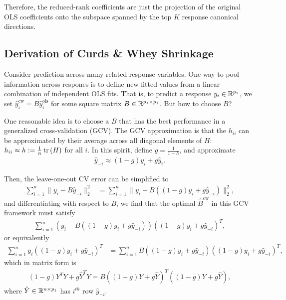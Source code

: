 \documentclass{article}
\begin{document}
Therefore, the reduced-rank coefficients are just the projection of the original
OLS coefficients onto the subspace spanned by the top $K$ response canonical
directions.

\subsection{Derivation of Curds \& Whey Shrinkage}
\label{subsec:derivation_curds_and_whey}

Consider prediction across many related response variables. One way to pool
information across respones is to define new fitted values from a linear
combination of independent OLS fits. That is, to predict a response $y_{i} \in
\mathbb{R}^{p_{1}}$, we set $\hat{y}^{\text{cw}}_{i} = B\hat{y}^{\text{ols}}_{i}$
for some square matrix $B \in \mathbb{R}^{p_{1} \times p_{1}}$. But how to choose
$B$?

One reasonable idea is to choose a $B$ that has the best performance in a
generalized cross-validation (GCV). The GCV approximation is that the $h_{ii}$
can be approximated by their average across all diagonal elements of $H$:
$h_{ii} \approx h := \frac{1}{n}\mathop\mathrm{tr}\left(H\right)$ for all $i$. In this spirit,
define $g = \frac{1}{1 - h}$, and approximate
\begin{align*}
  \hat{y}_{-i} \approx \left(1 - g\right)y_{i} + g\hat{y}_{i}.
\end{align*}

Then, the leave-one-out CV error can be simplified to
\begin{align*}
  \sum_{i = 1}^{n}\|y_{i} - B\hat{y}_{-i}\|_{2}^{2} &= \sum_{i =
    1}^{n} \|y_{i} - B\left(\left(1 - g\right)y_{i} +
    g\hat{y}_{-i}\right)\|_{2}^{2},
\end{align*}
and differentiating with respect to $B$, we find that the optimal
$\hat{B}^{\text{cw}}$ in this GCV framework must satisfy
\begin{align*}
\sum_{i = 1}^{n}\left(y_{i} - B\left(\left(1 - g\right)y_{i} +
    g\hat{y}_{-i}\right)\right)\left(\left(1 - g\right)y_{i} +
  g\hat{y}_{-i}\right)^{T},
\end{align*}
or equivalently
\begin{align*}
\sum_{i = 1}^{n} y_{i}\left(\left(1 - g\right)y_{i} +
  g\hat{y}_{-i}\right)^{T} &=  \sum_{i = 1}^{n}B\left(\left(1 -
    g\right)y_{i} + g\hat{y}_{-i}\right)\left(\left(1 - g\right)y_{i}
  +  g\hat{y}_{-i}\right)^{T},
\end{align*}
which in matrix form is
\begin{align}
\left(1 - g\right)Y^{T}Y + g\hat{Y}^{T}Y = B\left(\left(1 - g\right)Y
  + g \hat{Y}\right)^{T}\left(\left(1 - g\right)Y + g \hat{Y}\right), \label{eq:gcv_mat_form}
\end{align}
where $\hat{Y} \in \mathbb{R}^{n \times p_{1}}$ has $i^{th}$ row
$\hat{y}_{-i}$.
\end{document}
